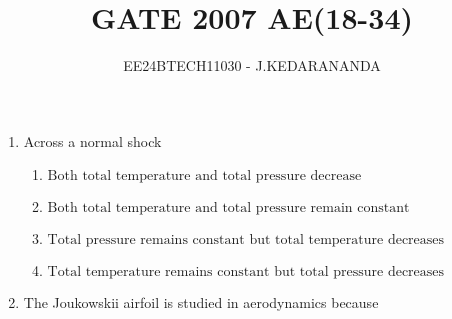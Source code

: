 \documentclass[journal]{IEEEtran}
\renewcommand{\thefigure}{\theenumi}
\renewcommand{\thetable}{\theenumi}
\numberwithin{equation}{enumi}
\numberwithin{figure}{enumi}
\renewcommand{\thetable}{\theenumi}
\begin{document}

\vspace{3cm}

\title{GATE 2007 AE(18-34)}
\author{EE24BTECH11030 - J.KEDARANANDA}
{\let\newpage\relax\maketitle}
\renewcommand{\thefigure}{\theenumi}
\renewcommand{\thetable}{\theenumi}
\begin{enumerate}
\item Across a normal shock
    \begin{enumerate}
        \item $ \text{Both total temperature and total pressure decrease} $
        \item $ \text{Both total temperature and total pressure remain constant} $
        \item $ \text{Total pressure remains constant but total temperature decreases} $
        \item $ \text{Total temperature remains constant but total pressure decreases} $
    \end{enumerate}
\bigskip
\item The Joukowskii airfoil is studied in aerodynamics because


\end{enumerate}
\end{document}
